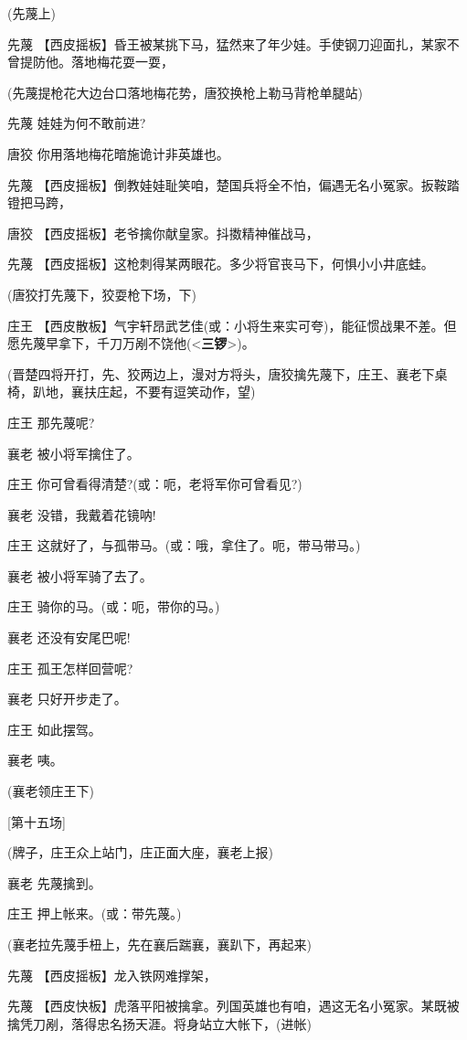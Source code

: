(先蔑上)

先蔑
【西皮摇板】昏王被某挑下马，猛然来了年少娃。手使钢刀迎面扎，某家不曾提防他。落地梅花耍一耍，

(先蔑提枪花大边台口落地梅花势，唐狡换枪上勒马背枪单腿站)

先蔑 娃娃为何不敢前进?

唐狡 你用落地梅花暗施诡计非英雄也。

先蔑
【西皮摇板】倒教娃娃耻笑咱，楚国兵将全不怕，偏遇无名小冤家。扳鞍踏镫把马跨，

唐狡 【西皮摇板】老爷擒你献皇家。抖擞精神催战马，

先蔑 【西皮摇板】这枪刺得某两眼花。多少将官丧马下，何惧小小井底蛙。

(唐狡打先蔑下，狡耍枪下场，下)

庄王
【西皮散板】气宇轩昂武艺佳(或：小将生来实可夸)，能征惯战果不差。但愿先蔑早拿下，千刀万剐不饶他(\textless{}\textbf{三锣}\textgreater{})。

(晋楚四将开打，先、狡两边上，漫对方将头，唐狡擒先蔑下，庄王、襄老下桌椅，趴地，襄扶庄起，不要有逗笑动作，望)

庄王 那先蔑呢?

襄老 被小将军擒住了。

庄王 你可曾看得清楚?(或：呃，老将军你可曾看见?)

襄老 没错，我戴着花镜呐!

庄王 这就好了，与孤带马。(或：哦，拿住了。呃，带马带马。)

襄老 被小将军骑了去了。

庄王 骑你的马。(或：呃，带你的马。)

襄老 还没有安尾巴呢!

庄王 孤王怎样回营呢?

襄老 只好开步走了。

庄王 如此摆驾。

襄老 咦。

(襄老领庄王下)

{[}第十五场{]}

(牌子，庄王众上站门，庄正面大座，襄老上报)

襄老 先蔑擒到。

庄王 押上帐来。(或：带先蔑。)

(襄老拉先蔑手杻上，先在襄后踹襄，襄趴下，再起来)

先蔑 【西皮摇板】龙入铁网难撑架，

先蔑
【西皮快板】虎落平阳被擒拿。列国英雄也有咱，遇这无名小冤家。某既被擒凭刀剐，落得忠名扬天涯。将身站立大帐下，(进帐)

